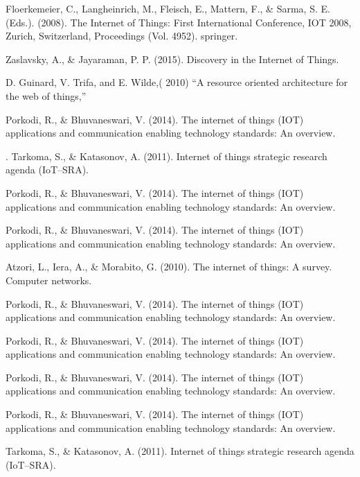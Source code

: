 \documentclass[conference]{IEEEtran}
\begin{document}
\begin{thebibliography}{00}
	

	
Floerkemeier, C., Langheinrich, M., Fleisch, E., Mattern, F., \& Sarma, S. E. (Eds.). (2008). The Internet of Things: First International Conference, IOT 2008, Zurich, Switzerland, Proceedings (Vol. 4952). springer.

Zaslavsky, A., \& Jayaraman, P. P. (2015). Discovery in the Internet of Things. 
  
 D. Guinard, V. Trifa, and E. Wilde,( 2010) “A resource oriented architecture for the web of things,”
 
 Porkodi, R., \& Bhuvaneswari, V. (2014). The internet of things (IOT) applications and communication enabling technology standards: An overview. 

.
 Tarkoma, S., \& Katasonov, A. (2011). Internet of things strategic research agenda (IoT–SRA). 
 
  
 Porkodi, R., \& Bhuvaneswari, V. (2014). The internet of things (IOT) applications and communication enabling technology standards: An overview. 
 
 Porkodi, R., \& Bhuvaneswari, V. (2014). The internet of things (IOT) applications and communication enabling technology standards: An overview. 
 
 Atzori, L., Iera, A., \& Morabito, G. (2010). The internet of things: A survey. Computer networks.

 Porkodi, R., \& Bhuvaneswari, V. (2014). The internet of things (IOT) applications and communication enabling technology standards: An overview. 
 
  Porkodi, R., \& Bhuvaneswari, V. (2014). The internet of things (IOT) applications and communication enabling technology standards: An overview. 
  
    Porkodi, R., \& Bhuvaneswari, V. (2014). The internet of things (IOT) applications and communication enabling technology standards: An overview. 
    
      Porkodi, R., \& Bhuvaneswari, V. (2014). The internet of things (IOT) applications and communication enabling technology standards: An overview. 
  
   Tarkoma, S., \& Katasonov, A. (2011). Internet of things strategic research agenda (IoT–SRA). 
   

\end{thebibliography}
\end{document}
